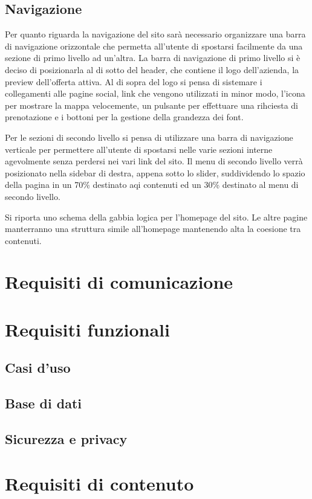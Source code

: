 \documentclass[a4paper,12pt,hidelinks]{report}
\begin{document}
\subsection{Navigazione}
Per quanto riguarda la navigazione del sito sarà necessario organizzare una barra di navigazione orizzontale che permetta all'utente di spostarsi facilmente da una sezione di primo livello
ad un'altra. La barra di navigazione di primo livello si è deciso di posizionarla al di sotto del header, che contiene il logo dell'azienda, la preview dell'offerta attiva. Al di sopra del logo
si pensa di sistemare i collegamenti alle pagine social, link che vengono utilizzati in minor modo, l'icona per mostrare la mappa velocemente, un pulsante per effettuare una rihciesta di prenotazione
e i bottoni per la gestione della grandezza dei font.
\par Per le sezioni di secondo livello si pensa di utilizzare una barra di navigazione verticale per permettere all'utente di spostarsi nelle varie sezioni interne agevolmente senza
perdersi nei vari link del sito. Il menu di secondo livello verrà posizionato nella sidebar di destra, appena sotto lo slider, suddividendo lo spazio della pagina in un 70\% destinato aqi contenuti
ed un 30\% destinato al menu di secondo livello.
\par Si riporta uno schema della gabbia logica per l'homepage del sito. Le altre pagine manterranno una struttura simile all'homepage mantenendo alta la coesione tra contenuti.

\section{Requisiti di comunicazione}

\section{Requisiti funzionali}
	\subsection{Casi d'uso}
	\subsection{Base di dati}
	\subsection{Sicurezza e privacy}

\section{Requisiti di contenuto}
\end{document}
